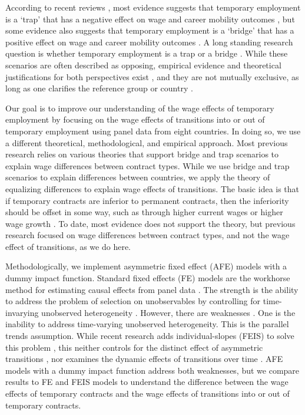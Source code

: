 \documentclass[12pt]{article}
\begin{document}
According to recent reviews \citep{latner_wage_2022,filomena_picchio_2022}, most evidence suggests that temporary employment is a `trap' that has a negative effect on wage and career mobility outcomes \citep{giesecke_external_2004,gebel_early_2010,pavlopoulos_starting_2013,barbieri_dual_2018}, but some evidence also suggests that temporary employment is a `bridge' that has a positive effect on wage and career mobility outcomes \citep{remery_labour_2002, gash_fixed-term_2007,de_lange_consequences_2014,gebel_is_2013}.  A long standing research question is whether temporary employment is a trap or a bridge \citep{booth_temporary_2002,scherer_stepping-stones_2004,gash_bridge_2008,babos_step_2014,mcvicar_contingent_2019,mattijssen_multichannel_2019}.  While these scenarios are often described as opposing, empirical evidence and theoretical justifications for both perspectives exist \citep{mattijssen_occupations_2020}, and they are not mutually exclusive, as long as one clarifies the reference group or country \citep{latner_wage_2022}.  

Our goal is to improve our understanding of the wage effects of temporary employment by focusing on the wage effects of transitions into or out of temporary employment using panel data from eight countries.  In doing so, we use a different theoretical, methodological, and empirical approach.  Most previous research relies on various theories that support bridge and trap scenarios to explain wage differences between contract types.  While we use bridge and trap scenarios to explain differences between countries, we apply the theory of equalizing differences to explain wage effects of transitions.  The basic idea is that if temporary contracts are inferior to permanent contracts, then the inferiority should be offset in some way, such as through higher current wages or higher wage growth \citep{rosen_theory_1986}.  To date, most evidence does not support the theory, but previous research focused on wage differences between contract types, and not the wage effect of transitions, as we do here.  

Methodologically, we implement asymmetric fixed effect (AFE) models with a dummy impact function.  Standard fixed effects (FE) models are the workhorse method for estimating causal effects from panel data \citep{wooldridge2005fixed,imai2021use}.  The strength is the ability to address the problem of selection on unobservables by controlling for time-invarying unobserved heterogeneity \citep{halaby_panel_2004,gangl_causal_2010}.  However, there are weaknesses \citep{collischon2020let}.  One is the inability to address time-varying unobserved heterogeneity.  This is the parallel trends assumption.  While recent research adds individual-slopes (FEIS) to solve this problem \citep{ludwig_is_2018}, this neither controls for the distinct effect of asymmetric transitions \citep{allison_asymmetric_2019}, nor examines the dynamic effects of transitions over time \citep{andres_applied_2013,ludwig_what_2021}.  AFE models with a dummy impact function address both weaknesses, but we compare results to FE and FEIS models to understand the difference between the wage effects of temporary contracts and the wage effects of transitions into or out of temporary contracts.  
\end{document}
